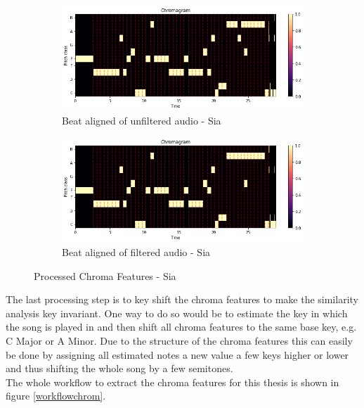 \begin{figure}[htbp]
{{			\begin{subfigure}{.495\textwidth}
				\centering    
				\includegraphics[scale=0.3]{Images/Chroma/siaunfiltered.png}
				\caption{Beat aligned of unfiltered audio - Sia}
				\label{siaub}
			\end{subfigure}
			\begin{subfigure}{.495\textwidth}
				\centering     
				\includegraphics[scale=0.3]{Images/Chroma/siafiltered.png}
				\caption{Beat aligned of filtered audio - Sia}
				\label{siafb}
			\end{subfigure}%
	}}
	\caption{Processed Chroma Features - Sia}
	\label{beataligned}
\end{figure}
The last processing step is to key shift the chroma features to make the similarity analysis key invariant. One way to do so would be to estimate the key in which the song is played in and then shift all chroma features to the same base key, e.g. C Major or A Minor. Due to the structure of the chroma features this can easily be done by assigning all estimated notes a new value a few keys higher or lower and thus shifting the whole song by a few semitones.\\
The whole workflow to extract the chroma features for this thesis is shown in figure \ref{workflowchrom}.
\begin{figure}[htbp]
	\centering
\end{figure}
